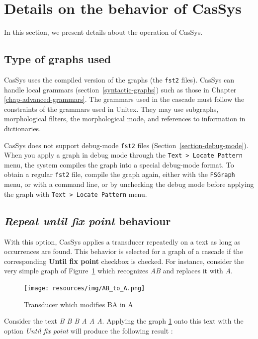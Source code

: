\section{Details on the behavior of CasSys}

In this section, we present details about the operation of CasSys.

\subsection{Type of graphs used}
\label{graphs-for-cassys}

CasSys uses the compiled version of the graphs (the \verb+fst2+ files). CasSys can handle local grammars (section~\ref{syntactic-graphs}) such as those in Chapter \ref{chap-advanced-grammars}. 
The grammars used in the cascade must follow the constraints of the grammars used in Unitex.
They may use subgraphs, morphological filters, the morphological mode, and references to information in dictionaries.
 
\bigskip
\noindent CasSys does not support debug-mode \verb+fst2+ files (Section~\ref{section-debug-mode}). When you apply a graph in debug mode through the \verb+Text > Locate Pattern+ menu, the system compiles the graph into a special debug-mode format. To obtain a regular \verb+fst2+ file, compile the graph again, either with the \verb+FSGraph+ menu, or with a command line, or by unchecking the debug mode before applying the graph with \verb+Text > Locate Pattern+ menu.

\subsection{\textit{Repeat until fix point} behaviour}
\label{sub:AppWhiCon}

With this option, CasSys applies a transducer repeatedly on a text as long as occurrences are found. This behavior is selected for a graph of a cascade if the corresponding \textbf{Until fix point} checkbox is checked.
For instance, consider the very simple graph of Figure~\ref{fig:AB->A} which recognizes \emph{AB} and
replaces it with \emph{A}. 

\begin{figure}[!htb]
  \centering
  \texttt{[image: resources/img/AB\_to\_A.png]}
  \caption{Transducer which modifies BA in A}
  \label{fig:AB->A}
\end{figure}

Consider the text \emph{B B B A A A}. Applying the graph \ref{fig:AB->A} onto this text with the option \emph{Until fix point} will produce the following result :\\

